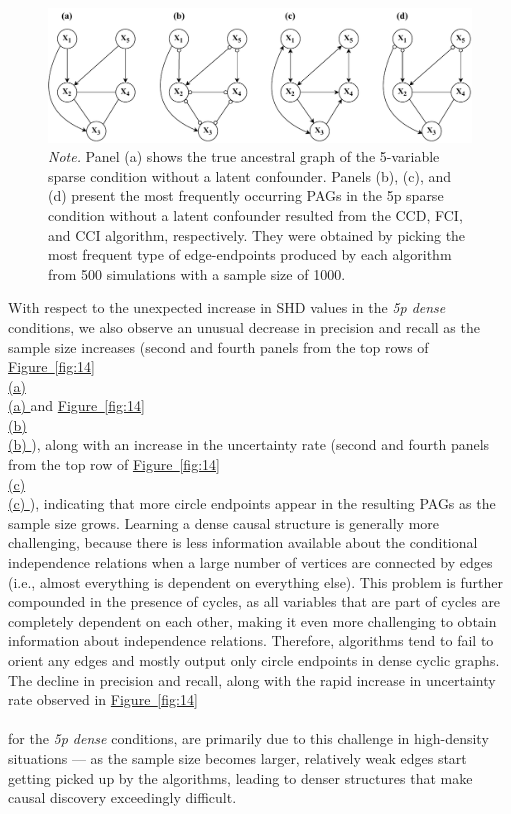 \documentclass[twoside, 11pt]{article}
\newcommand*{\figref}[2][]{%
  \hyperref[{fig:#2}]{%
    Figure~\ref*{fig:#2}%
    \ifx\\#1\\%
    \else
      #1%
    \fi
  }%
}
\begin{document}
\begin{figure}[!t]
    \centering
        \caption{Estimated PAGs in the 5-variable sparse condition without a latent confounder.}
        \vspace{1mm}
        \includegraphics[width=1\textwidth]{figures/Fig16.pdf}
        \vspace{1mm}
        \caption*{\small{\textit{Note.} Panel (a) shows the true ancestral graph of the 5-variable sparse condition without a latent confounder. Panels (b), (c), and (d) present the most frequently occurring PAGs in the 5p sparse condition without a latent confounder resulted from the CCD, FCI, and CCI algorithm, respectively. They were obtained by picking the most frequent type of edge-endpoints produced by each algorithm from 500 simulations with a sample size of 1000.}}

    \label{fig:18}
\end{figure}


With respect to the unexpected increase in SHD values in the \textit{5p dense} conditions, we also observe an unusual decrease in precision and recall as the sample size increases (second and fourth panels from the top rows of \figref[(a)]{14} and \figref[(b)]{14}), along with an increase in the uncertainty rate (second and fourth panels from the top row of \figref[(c)]{14}), indicating that more circle endpoints appear in the resulting PAGs as the sample size grows.
Learning a dense causal structure is generally more challenging, because there is less information available about the conditional independence relations when a large number of vertices are connected by edges (i.e., almost everything is dependent on everything else). 
This problem is further compounded in the presence of cycles, as all variables that are part of cycles are completely dependent on each other, making it even more challenging to obtain information about independence relations. Therefore, algorithms tend to fail to orient any edges and mostly output only circle endpoints in dense cyclic graphs. The decline in precision and recall, along with the rapid increase in uncertainty rate observed in \figref[]{14} for the \textit{5p dense} conditions, are primarily due to this challenge in high-density situations --- as the sample size becomes larger, relatively weak edges start getting picked up by the algorithms, leading to denser structures that make causal discovery exceedingly difficult.
\end{document}
